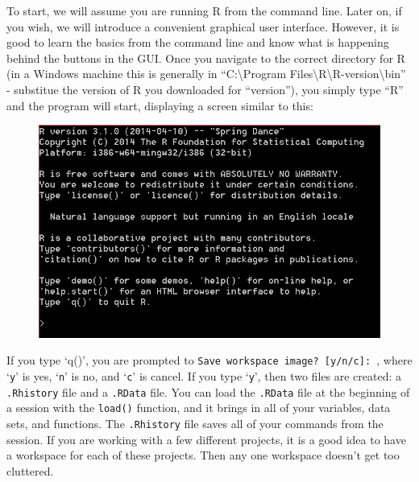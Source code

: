 \documentclass[11pt,letterpaper,fleqn]{report}
\begin{document}
To start, we will assume you are running R from the command line. Later on, if you wish, we will introduce a convenient graphical user interface. However, it is good to learn the basics from the command line and know what is happening behind the buttons in the GUI. Once you navigate to the correct directory for R (in a Windows machine this is generally in ``C:\textbackslash Program Files\textbackslash R\textbackslash R-version\textbackslash bin'' - substitue the version of R you downloaded for ``version''), you simply type ``R'' and the program will start, displaying a screen similar to this:

\begin{figure}[h!]
\centering
	\includegraphics[width=5in]{r_welcome.png}
\end{figure}

If you type `q()', you are prompted to \texttt{Save workspace image? [y/n/c]: }, where `\texttt{y}' is yes, `\texttt{n}' is no, and `\texttt{c}' is cancel. If you type `\texttt{y}', then two files are created: a \texttt{.Rhistory} file and a \texttt{.RData} file. You can load the \texttt{.RData} file at the beginning of a session with the \texttt{load()} function, and it brings in all of your variables, data sets, and functions. The \texttt{.Rhistory} file saves all of your commands from the session. If you are working with a few different projects, it is a good idea to have a workspace for each of these projects. Then any one workspace doesn't get too cluttered.
\end{document}
